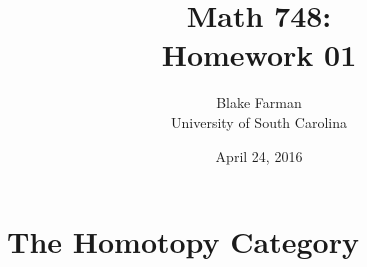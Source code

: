 \documentclass[10pt]{amsart}
\author{Blake Farman\\University of South Carolina}
\title{Math 748:\\Homework 01}
\date{April 24, 2016}
\begin{document}

\providecommand{\p}{\mathfrak{p}}
\providecommand{\m}{\mathfrak{m}}
\providecommand{\Deck}[1]{\operatorname{Deck}\left(#1\right)}
\newtheorem{thm}{Theorem}
\newtheorem{lem}{Lemma}
\newtheorem{cor}{Corollary}
\newtheorem{prop}{Proposition}
\theoremstyle{definition}
\newtheorem{defn}{Definition}
\newtheorem{rmk}{Remark}
\newtheorem{ex}{Example}

\newcommand{\A}{\mathscr{A}}
\renewcommand{\C}{\mathscr{C}}
\newcommand{\D}{\mathscr{D}}
\newcommand{\F}{\mathscr{F}}
\newcommand{\G}{\mathscr{G}}

\section{The Homotopy Category}
\end{document}
